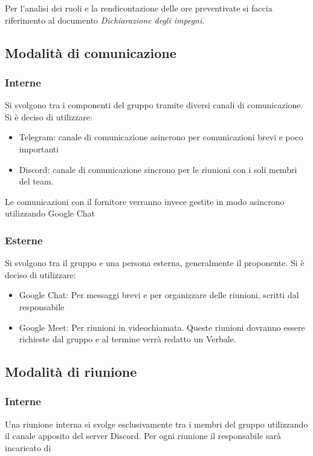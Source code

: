             Per l'analisi dei ruoli e la rendicontazione delle ore preventivate si faccia riferimento al documento \textit{Dichiarazione degli impegni}.

    \subsection{Modalità di comunicazione}
        \subsubsection{Interne}
        Si svolgono tra i componenti del gruppo tramite diversi canali di comunicazione.\\
        Si è deciso di utilizzare:

        \begin{itemize}
            \item Telegram: canale di comunicazione asincrono per comunicazioni brevi e poco importanti
            \item Discord: canale di comunicazione sincrono per le riunioni con i soli membri del team.\\ 
        \end{itemize}
        Le comunicazioni con il fornitore verranno invece gestite in modo asincrono 
        utilizzando Google Chat
        \subsubsection{Esterne}
        Si svolgono tra il gruppo e una persona esterna, generalmente il proponente.
        Si è deciso di utilizzare:

        \begin{itemize}
            \item Google Chat: Per messaggi brevi e per organizzare delle riunioni, scritti dal responsabile
            \item Google Meet: Per riunioni in videochiamata. Queste riunioni dovranno essere richieste
            dal gruppo e al termine verrà redatto un Verbale.
        \end{itemize}


    \subsection{Modalità di riunione}
        \subsubsection{Interne}
        Una riunione interna si svolge esclusivamente tra i membri del gruppo utilizzando il canale apposito
        del server Discord. Per ogni riunione il responsabile sarà incaricato di

